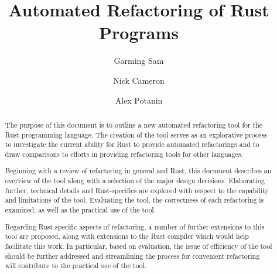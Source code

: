 \documentclass{article}
\begin{document}
\title{Automated Refactoring of Rust Programs}

\author{Garming Sam \and Nick Cameron \and Alex Potanin}

\maketitle

\begin{abstract}
The purpose of this document is to outline a new automated refactoring tool for the Rust programming language. The creation of the tool serves as an explorative process to investigate the current ability for Rust to provide automated refactorings and to draw comparisons to  efforts in providing refactoring tools for other languages. 

Beginning with a review of refactoring in general and Rust, this document describes an overview of the tool along with a selection of the major design decisions. Elaborating further, technical details and Rust-specifics are explored with respect to the capability and limitations of the tool. Evaluating the tool, the correctness of each refactoring is examined, as well as the practical use of the tool.

Regarding Rust specific aspects of refactoring, a number of further extensions to this tool are proposed, along with extensions to the Rust compiler which would help facilitate this work. In particular, based on evaluation, the issue of efficiency of the tool should be further addressed and streamlining the process for convenient refactoring will contribute to the practical use of the tool.
\end{abstract}










\end{document}
